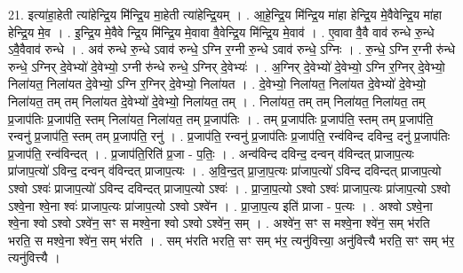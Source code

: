 \documentclass[17pt]{extarticle}
\begin{document}
21. इत्या॑हा॒हेती त्या॑हेन्द्रि॒य मि॑न्द्रि॒य मा॒हेती त्या॑हेन्द्रि॒यम् । . आ॒हे॒न्द्रि॒य मि॑न्द्रि॒य मा॑हा हेन्द्रि॒य मे॒वैवेन्द्रि॒य मा॑हा हेन्द्रि॒य मे॒व । . इ॒न्द्रि॒य मे॒वैवे न्द्रि॒य मि॑न्द्रि॒य मे॒वावा वै॒वेन्द्रि॒य मि॑न्द्रि॒य मे॒वाव॑ । . ए॒वावा वै॒वै वाव॑ रुन्धे रु॒न्धे ऽवै॒वैवाव॑ रुन्धे । . अव॑ रुन्धे रु॒न्धे ऽवाव॑ रुन्धे॒ ऽग्नि र॒ग्नी रु॒न्धे ऽवाव॑ रुन्धे॒ ऽग्निः । . रु॒न्धे॒ ऽग्नि र॒ग्नी रु॑न्धे रुन्धे॒ ऽग्निर् दे॒वेभ्यो॑ दे॒वेभ्यो॒ ऽग्नी रु॑न्धे रुन्धे॒ ऽग्निर् दे॒वेभ्यः॑ । . अ॒ग्निर् दे॒वेभ्यो॑ दे॒वेभ्यो॒ ऽग्नि र॒ग्निर् दे॒वेभ्यो॒ निला॑यत॒ निला॑यत दे॒वेभ्यो॒ ऽग्नि र॒ग्निर् दे॒वेभ्यो॒ निला॑यत । . दे॒वेभ्यो॒ निला॑यत॒ निला॑यत दे॒वेभ्यो॑ दे॒वेभ्यो॒ निला॑यत॒ तम् तम् निला॑यत दे॒वेभ्यो॑ दे॒वेभ्यो॒ निला॑यत॒ तम् । . निला॑यत॒ तम् तम् निला॑यत॒ निला॑यत॒ तम् प्र॒जाप॑तिः प्र॒जाप॑ति॒ स्तम् निला॑यत॒ निला॑यत॒ तम् प्र॒जाप॑तिः । . तम् प्र॒जाप॑तिः प्र॒जाप॑ति॒ स्तम् तम् प्र॒जाप॑ति॒ रन्वनु॑ प्र॒जाप॑ति॒ स्तम् तम् प्र॒जाप॑ति॒ रनु॑ । . प्र॒जाप॑ति॒ रन्वनु॑ प्र॒जाप॑तिः प्र॒जाप॑ति॒ रन्व॑विन्द दविन्द॒ दनु॑ प्र॒जाप॑तिः प्र॒जाप॑ति॒ रन्व॑विन्दत् । . प्र॒जाप॑ति॒रिति॑ प्र॒जा - प॒तिः॒ । . अन्व॑विन्द दविन्द॒ दन्वन् व॑विन्दत् प्राजाप॒त्यः प्रा॑जाप॒त्यो॑ ऽविन्द॒ दन्वन् व॑विन्दत् प्राजाप॒त्यः । . अ॒वि॒न्द॒त् प्रा॒जा॒प॒त्यः प्रा॑जाप॒त्यो॑ ऽविन्द दविन्दत् प्राजाप॒त्यो ऽश्वो ऽश्वः॑ प्राजाप॒त्यो॑ ऽविन्द दविन्दत् प्राजाप॒त्यो ऽश्वः॑ । . प्रा॒जा॒प॒त्यो ऽश्वो ऽश्वः॑ प्राजाप॒त्यः प्रा॑जाप॒त्यो ऽश्वो ऽश्वे॒ना श्वे॒ना श्वः॑ प्राजाप॒त्यः प्रा॑जाप॒त्यो ऽश्वो ऽश्वे॑न । . प्रा॒जा॒प॒त्य इति॑ प्राजा - प॒त्यः । . अश्वो ऽश्वे॒ना श्वे॒ना श्वो ऽश्वो ऽश्वे॑न॒ सꣳ स मश्वे॒ना श्वो ऽश्वो ऽश्वे॑न॒ सम् । . अश्वे॑न॒ सꣳ स मश्वे॒ना श्वे॑न॒ सम् भ॑रति भरति॒ स मश्वे॒ना श्वे॑न॒ सम् भ॑रति । . सम् भ॑रति भरति॒ सꣳ सम् भ॑र॒ त्यनु॑वित्त्या॒ अनु॑वित्त्यै भरति॒ सꣳ सम् भ॑र॒ त्यनु॑वित्त्यै । \newline
\end{document}
